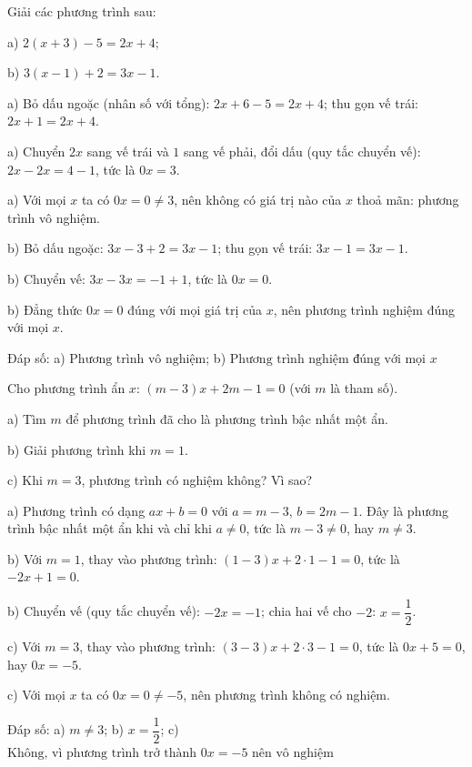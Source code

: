 \begin{problem}[8DS-PT1-013]
Giải các phương trình sau:

a) $2(x + 3) - 5 = 2x + 4$;

b) $3(x - 1) + 2 = 3x - 1$.

\begin{solution}
a) Bỏ dấu ngoặc (nhân số với tổng): $2x + 6 - 5 = 2x + 4$; thu gọn vế trái: $2x + 1 = 2x + 4$.

a) Chuyển $2x$ sang vế trái và $1$ sang vế phải, đổi dấu (quy tắc chuyển vế): $2x - 2x = 4 - 1$, tức là $0x = 3$.

a) Với mọi $x$ ta có $0x = 0 \neq 3$, nên không có giá trị nào của $x$ thoả mãn: phương trình vô nghiệm.

b) Bỏ dấu ngoặc: $3x - 3 + 2 = 3x - 1$; thu gọn vế trái: $3x - 1 = 3x - 1$.

b) Chuyển vế: $3x - 3x = -1 + 1$, tức là $0x = 0$.

b) Đẳng thức $0x = 0$ đúng với mọi giá trị của $x$, nên phương trình nghiệm đúng với mọi $x$.

Đáp số: a) $\boxed{\text{Phương trình vô nghiệm}}$; b) $\boxed{\text{Phương trình nghiệm đúng với mọi } x}$
\end{solution}
\end{problem}

\begin{problem}[8DS-PT1-014]
Cho phương trình ẩn $x$: $(m - 3)x + 2m - 1 = 0$ (với $m$ là tham số).

a) Tìm $m$ để phương trình đã cho là phương trình bậc nhất một ẩn.

b) Giải phương trình khi $m = 1$.

c) Khi $m = 3$, phương trình có nghiệm không? Vì sao?

\begin{solution}
a) Phương trình có dạng $ax + b = 0$ với $a = m - 3$, $b = 2m - 1$. Đây là phương trình bậc nhất một ẩn khi và chỉ khi $a \neq 0$, tức là $m - 3 \neq 0$, hay $m \neq 3$.

b) Với $m = 1$, thay vào phương trình: $(1 - 3)x + 2 \cdot 1 - 1 = 0$, tức là $-2x + 1 = 0$.

b) Chuyển vế (quy tắc chuyển vế): $-2x = -1$; chia hai vế cho $-2$: $x = \dfrac{1}{2}$.

c) Với $m = 3$, thay vào phương trình: $(3 - 3)x + 2 \cdot 3 - 1 = 0$, tức là $0x + 5 = 0$, hay $0x = -5$.

c) Với mọi $x$ ta có $0x = 0 \neq -5$, nên phương trình không có nghiệm.

Đáp số: a) $\boxed{m \neq 3}$; b) $\boxed{x = \dfrac{1}{2}}$; c) $\boxed{\text{Không, vì phương trình trở thành } 0x = -5 \text{ nên vô nghiệm}}$
\end{solution}
\end{problem}

